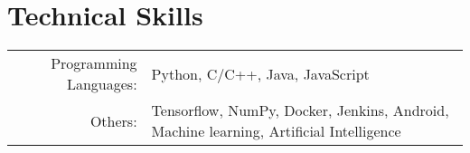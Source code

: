 \section{Technical Skills}
\renewcommand{\arraystretch}{1}%
\begin{tabular}{rl}

Programming Languages: &  Python, C/C++, Java, JavaScript\\
Others: & Tensorflow, NumPy, Docker, Jenkins, Android, Machine learning, Artificial Intelligence \\
\end{tabular}
\vspace{5pt}

